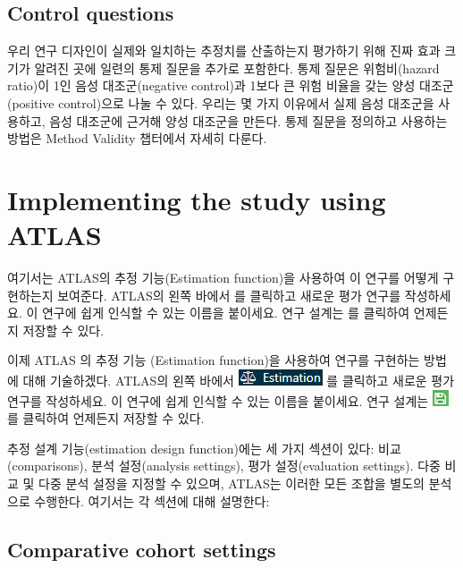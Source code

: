 \documentclass[]{book}
\begin{document}
\hypertarget{control-questions}{%
\subsection{Control questions}\label{control-questions}}

우리 연구 디자인이 실제와 일치하는 추정치를 산출하는지 평가하기 위해 진짜 효과 크기가 알려진 곳에 일련의 통제 질문을 추가로 포함한다. 통제 질문은 위험비(hazard ratio)이 1인 음성 대조군(negative control)과 1보다 큰 위험 비율을 갖는 양성 대조군(positive control)으로 나눌 수 있다. 우리는 몇 가지 이유에서 실제 음성 대조군을 사용하고, 음성 대조군에 근거해 양성 대조군을 만든다. 통제 질문을 정의하고 사용하는 방법은 Method Validity 챕터에서 자세히 다룬다.

\hypertarget{PleAtlas}{%
\section{Implementing the study using ATLAS}\label{PleAtlas}}

여기서는 ATLAS의 추정 기능(Estimation function)을 사용하여 이 연구를 어떻게 구현하는지 보여준다. ATLAS의 왼쪽 바에서 를 클릭하고 새로운 평가 연구를 작성하세요. 이 연구에 쉽게 인식할 수 있는 이름을 붙이세요. 연구 설계는 를 클릭하여 언제든지 저장할 수 있다.

이제 ATLAS 의 추정 기능 (Estimation function)을 사용하여 연구를 구현하는 방법에 대해 기술하겠다. ATLAS의 왼쪽 바에서 \includegraphics{images/PopulationLevelEstimation/estimation.png} 를 클릭하고 새로운 평가 연구를 작성하세요. 이 연구에 쉽게 인식할 수 있는 이름을 붙이세요. 연구 설계는 \includegraphics{images/PopulationLevelEstimation/save.png} 를 클릭하여 언제든지 저장할 수 있다.

추정 설계 기능(estimation design function)에는 세 가지 섹션이 있다: 비교(comparisons), 분석 설정(analysis settings), 평가 설정(evaluation settings). 다중 비교 및 다중 분석 설정을 지정할 수 있으며, ATLAS는 이러한 모든 조합을 별도의 분석으로 수행한다. 여기서는 각 섹션에 대해 설명한다:

\hypertarget{ComparisonSettings}{%
\subsection{Comparative cohort settings}\label{ComparisonSettings}}
\end{document}
